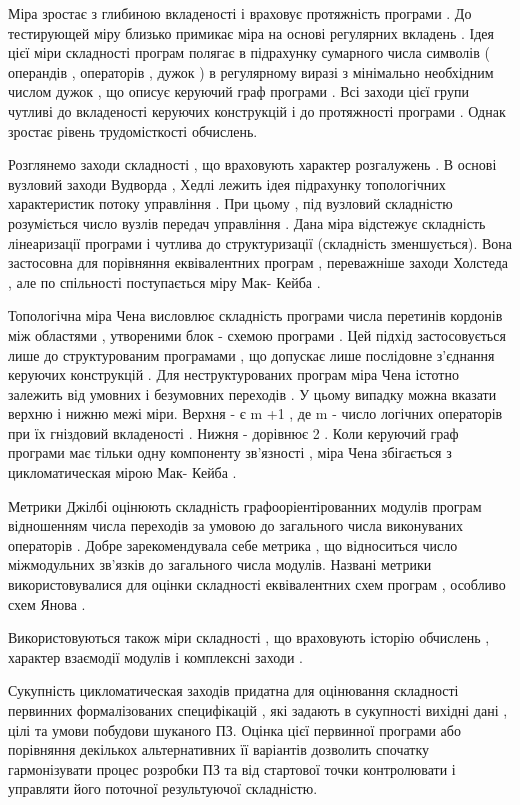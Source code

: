 \documentclass[oneside,final,14pt]{extreport}
\begin{document}
Міра зростає з глибиною вкладеності і враховує протяжність програми . До тестирующей міру близько примикає міра на основі регулярних вкладень . Ідея цієї міри складності програм полягає в підрахунку сумарного числа символів ( операндів , операторів , дужок ) в регулярному виразі з мінімально необхідним числом дужок , що описує керуючий граф програми . Всі заходи цієї групи чутливі до вкладеності керуючих конструкцій і до протяжності програми . Однак зростає рівень трудомісткості обчислень.

Розглянемо заходи складності , що враховують характер розгалужень . В основі вузловий заходи Вудворда , Хедлі лежить ідея підрахунку топологічних характеристик потоку управління . При цьому , під вузловий складністю розуміється число вузлів передач управління . Дана міра відстежує складність лінеаризації програми і чутлива до структуризації (складність зменшується). Вона застосовна для порівняння еквівалентних програм , переважніше заходи Холстеда , але по спільності поступається міру Мак- Кейба .

Топологічна міра Чена висловлює складність програми числа перетинів кордонів між областями , утвореними блок - схемою програми . Цей підхід застосовується лише до структурованим програмами , що допускає лише послідовне з'єднання керуючих конструкцій . Для неструктурованих програм міра Чена істотно залежить від умовних і безумовних переходів . У цьому випадку можна вказати верхню і нижню межі міри. Верхня - є m +1 , де m - число логічних операторів при їх гніздовий вкладеності . Нижня - дорівнює 2 . Коли керуючий граф програми має тільки одну компоненту зв'язності , міра Чена збігається з цикломатическая мірою Мак- Кейба .

Метрики Джілбі оцінюють складність графооріентірованних модулів програм відношенням числа переходів за умовою до загального числа виконуваних операторів . Добре зарекомендувала себе метрика , що відноситься число міжмодульних зв'язків до загального числа модулів. Названі метрики використовувалися для оцінки складності еквівалентних схем програм , особливо схем Янова .

Використовуються також міри складності , що враховують історію обчислень , характер взаємодії модулів і комплексні заходи .

Сукупність цикломатическая заходів придатна для оцінювання складності первинних формалізованих специфікацій , які задають в сукупності вихідні дані , цілі та умови побудови шуканого ПЗ. Оцінка цієї первинної програми або порівняння декількох альтернативних її варіантів дозволить спочатку гармонізувати процес розробки ПЗ та від стартової точки контролювати і управляти його поточної результуючої складністю.
\end{document}
